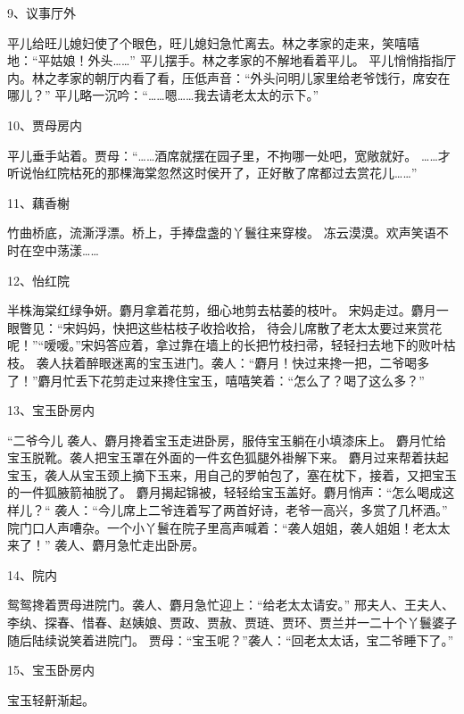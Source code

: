 9、议事厅外\par
平儿给旺儿媳妇使了个眼色，旺儿媳妇急忙离去。林之孝家的走来，笑嘻嘻地：“平姑娘！外头……”
平儿摆手。林之孝家的不解地看着平儿。
平儿悄悄指指厅内。林之孝家的朝厅内看了看，压低声音：“外头问明儿家里给老爷饯行，席安在哪儿？”
平儿略一沉吟：“……嗯……我去请老太太的示下。”

10、贾母房内\par
平儿垂手站着。贾母：“……酒席就摆在园子里，不拘哪一处吧，宽敞就好。
……才听说怡红院枯死的那棵海棠忽然这时侯开了，正好散了席都过去赏花儿……”

11、藕香榭\par
竹曲桥底，流澌浮漂。桥上，手捧盘盏的丫鬟往来穿梭。
冻云漠漠。欢声笑语不时在空中荡漾……

12、怡红院\par
半株海棠红绿争妍。麝月拿着花剪，细心地剪去枯萎的枝叶。
宋妈走过。麝月一眼瞥见：“宋妈妈，快把这些枯枝子收拾收拾，
待会儿席散了老太太要过来赏花呢！”“嗳嗳。”宋妈答应着，拿过靠在墙上的长把竹枝扫帚，轻轻扫去地下的败叶枯枝。
袭人扶着醉眼迷离的宝玉进门。袭人：“麝月！快过来搀一把，二爷喝多了！”麝月忙丢下花剪走过来搀住宝玉，嘻嘻笑着：“怎么了？喝了这么多？”

13、宝玉卧房内\par
“二爷今儿
袭人、麝月搀着宝玉走进卧房，服侍宝玉躺在小填漆床上。
麝月忙给宝玉脱靴。袭人把宝玉罩在外面的一件玄色狐腿外褂解下来。
麝月过来帮着扶起宝玉，袭人从宝玉颈上摘下玉来，用自己的罗帕包了，塞在枕下，接着，又把宝玉的一件狐腋箭袖脱了。 麝月揭起锦被，轻轻给宝玉盖好。麝月悄声：“怎么喝成这样儿？“
袭人：“今儿席上二爷连着写了两首好诗，老爷一高兴，多赏了几杯酒。”
院门口人声嘈杂。一个小丫鬟在院子里高声喊着：“袭人姐姐，袭人姐姐！老太太来了！”
袭人、麝月急忙走出卧房。

14、院内\par
鸳鸳搀着贾母进院门。袭人、麝月急忙迎上：“给老太太请安。”
邢夫人、王夫人、李纨、探春、惜春、赵姨娘、贾政、贾赦、贾琏、贾环、贾兰并一二十个丫鬟婆子随后陆续说笑着进院门。
贾母：“宝玉呢？”袭人：“回老太太话，宝二爷睡下了。”

15、宝玉卧房内\par
宝玉轻鼾渐起。

